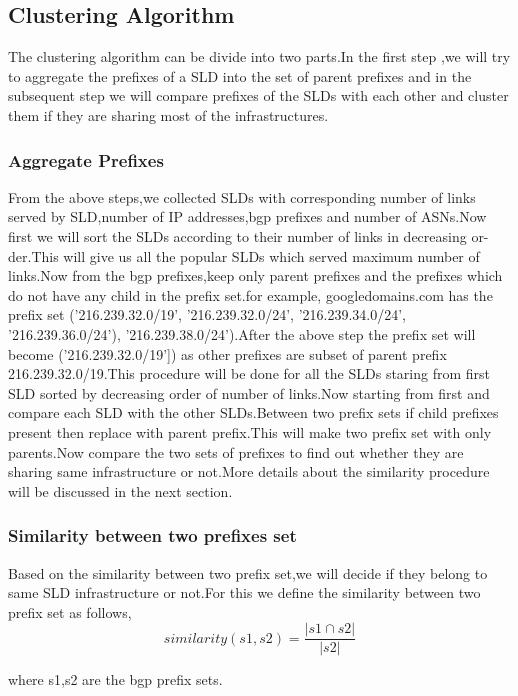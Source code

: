 \subsection{Clustering Algorithm}
The clustering algorithm can be divide into two parts.In the first step ,we will
try to aggregate the prefixes of a SLD into the set of parent prefixes and in
the subsequent step we will compare prefixes of the SLDs with each other and
cluster them if they are sharing most of the infrastructures.
\subsubsection{Aggregate Prefixes}
From the above steps,we collected SLDs with corresponding number of links
served by SLD,number of IP addresses,bgp prefixes and number of ASNs.Now
first we will sort the SLDs according to their number of links in decreasing or-
der.This will give us all the popular SLDs which served maximum number of
links.Now from the bgp prefixes,keep only parent prefixes and the prefixes which
do not have any child in the prefix set.for example, googledomains.com has the
prefix set (’216.239.32.0/19’, ’216.239.32.0/24’, ’216.239.34.0/24’, ’216.239.36.0/24’),
’216.239.38.0/24’).After the above step the prefix set will become (’216.239.32.0/19’])
as other prefixes are subset of parent prefix 216.239.32.0/19.This procedure will
be done for all the SLDs staring from first SLD sorted by decreasing order of
number of links.Now starting from first and compare each SLD with the other
SLDs.Between two prefix sets if child prefixes present then replace with parent
prefix.This will make two prefix set with only parents.Now compare the two sets
of prefixes to find out whether they are sharing same infrastructure or not.More
details about the similarity procedure will be discussed in the next section.
\subsubsection{Similarity between two prefixes set}
Based on the similarity between two prefix set,we will decide if they belong to
same SLD infrastructure or not.For this we define the similarity between two
prefix set as follows,
\begin{equation}
similarity(s1, s2)= \frac{|s1 \cap s2|}{|s2|}
\end{equation}

where s1,s2 are the bgp prefix sets.

